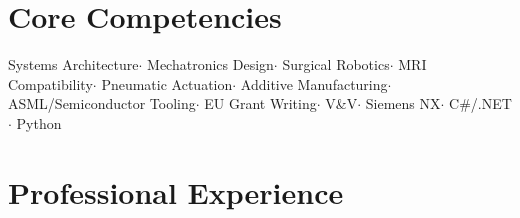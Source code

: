 \documentclass[10pt,a4paper]{article}
\begin{document}
\section{Core Competencies}
\begin{center}
\small
Systems Architecture\enspace$\cdot$\enspace
Mechatronics Design\enspace$\cdot$\enspace
Surgical Robotics\enspace$\cdot$\enspace
MRI Compatibility\enspace$\cdot$\enspace
Pneumatic Actuation\enspace$\cdot$\enspace
Additive Manufacturing\enspace$\cdot$\enspace
ASML/Semiconductor Tooling\enspace$\cdot$\enspace
EU Grant Writing\enspace$\cdot$\enspace
V\&V\enspace$\cdot$\enspace
Siemens NX\enspace$\cdot$\enspace
C\#/.NET\enspace$\cdot$\enspace
Python


\end{center}

\section{Professional Experience}
\end{document}
